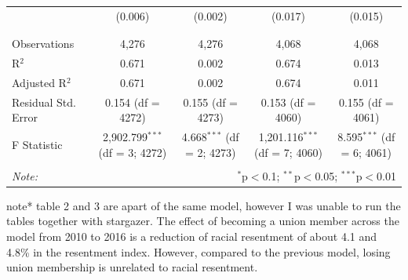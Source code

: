 \documentclass[12pt,letterpaper]{article}
\begin{document}
\begin{table}[H]
{\begin{tabular}{@{\extracolsep{5pt}}lcccc}
		& (0.006) & (0.002) & (0.017) & (0.015) \\ 
		& & & & \\ 
		\hline \\[-1.8ex] 
		Observations & 4,276 & 4,276 & 4,068 & 4,068 \\ 
		R$^{2}$ & 0.671 & 0.002 & 0.674 & 0.013 \\ 
		Adjusted R$^{2}$ & 0.671 & 0.002 & 0.674 & 0.011 \\ 
		Residual Std. Error & 0.154 (df = 4272) & 0.155 (df = 4273) & 0.153 (df = 4060) & 0.155 (df = 4061) \\ 
		F Statistic & 2,902.799$^{***}$ (df = 3; 4272) & 4.668$^{***}$ (df = 2; 4273) & 1,201.116$^{***}$ (df = 7; 4060) & 8.595$^{***}$ (df = 6; 4061) \\ 
		\hline 
		\hline \\[-1.8ex] 
		\textit{Note:}  & \multicolumn{4}{r}{$^{*}$p$<$0.1; $^{**}$p$<$0.05; $^{***}$p$<$0.01} \\ 
	\end{tabular} 
}
 
note* table 2 and 3 are apart of the same model, however I was unable to run the tables together with stargazer. 
The effect of becoming a union member across the model from 2010 to 2016 is a reduction of racial resentment of about 4.1 and 4.8\% in the resentment index. However, compared to the previous model, losing union membership is unrelated to racial resentment. 
\end{table}
\end{document}
